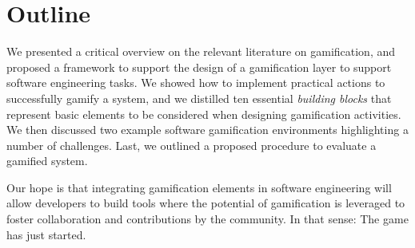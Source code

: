 \section{Outline}\label{sec:gamification-summary}

We presented a critical overview on the relevant literature on gamification, and proposed a framework to support the design of a gamification layer to support software engineering tasks.
We showed how to implement practical actions to successfully gamify a system, and we distilled ten essential \emph{building blocks} that represent basic elements to be considered when designing gamification activities.
We then discussed two example software gamification environments highlighting a number of challenges.
Last, we outlined a proposed procedure to evaluate a gamified system.


Our hope is that integrating gamification elements in software engineering will allow developers to build tools where the potential of gamification is leveraged to foster collaboration and contributions by the community.
In that sense: The game has just started.
